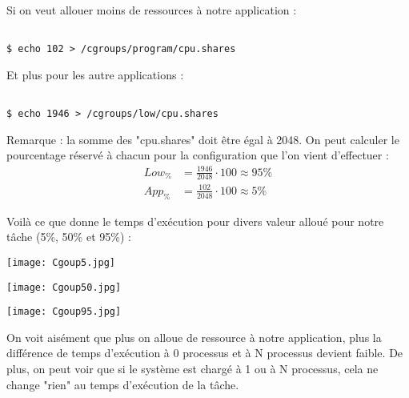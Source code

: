 Si on veut allouer moins de ressources à notre application :
\begin{lstlisting}[frame=single,style=Console]  % Start your code-block

$ echo 102 > /cgroups/program/cpu.shares
\end{lstlisting}

Et plus pour les autre applications :
\begin{lstlisting}[frame=single,style=Console]  % Start your code-block

$ echo 1946 > /cgroups/low/cpu.shares
\end{lstlisting}

Remarque : la somme des "cpu.shares" doit être égal à 2048. On peut calculer le pourcentage réservé à chacun pour la configuration que l'on vient d'effectuer :\\

\begin{align*}
Low_\% &= \frac{1946}{2048} \cdot 100 \approx 95\%  \\
App_\% &= \frac{102}{2048} \cdot 100 \approx 5\%
\end{align*}



\pagebreak Voilà ce que donne le temps d'exécution pour divers valeur alloué pour notre tâche (5\%, 50\% et 95\%) :

\begin{center} 
\hspace{12.45cm}
\texttt{[image: Cgoup5.jpg]}
\end{center}
\vspace{1cm}


\begin{center} 
\hspace{12.45cm}
\texttt{[image: Cgoup50.jpg]}
\end{center}
\vspace{0.5cm}


\begin{center} 
\hspace{12.45cm}
\texttt{[image: Cgoup95.jpg]}
\end{center}
\vspace{0.5cm}

 

On voit aisément que plus on alloue de ressource à notre application, plus la différence de temps d'exécution à 0 processus et à N processus devient faible. De plus, on peut voir que si le système est chargé à 1 ou à N processus, cela ne change "rien" au temps d'exécution de la tâche.\\

